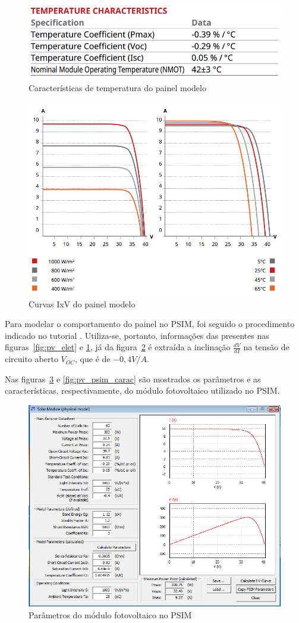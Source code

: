 \documentclass[
	12pt,				%
	openany,
	onseside,
	a4paper,			%
	english,			%
	french,				%
	spanish,			%
	brazil,				%
	]{abntex2}
\begin{document}
\begin{figure}[htbp]%
	\begin{center}%
		\includegraphics[width=0.55 \linewidth]{temp_canad_300}
		\caption{Características de temperatura do painel modelo \cite{Canadian_Datasheet}}
		\label{fig:pv_temp}
	\end{center}
\end{figure}

\begin{figure}[htbp]%
	\begin{center}%
		\includegraphics[width=0.55 \linewidth]{AV_canad_300}
		\caption{Curvas IxV do painel modelo \cite{Canadian_Datasheet}}
		\label{fig:IV_pv_cs}
	\end{center}
\end{figure}

Para modelar o comportamento do painel no PSIM, foi seguido o procedimento indicado no tutorial \cite{PSIM_PV}. Utiliza-se, portanto, informações das presentes nas figuras~\ref{fig:pv_elet} e \ref{fig:pv_temp}, já da figura~\ref{fig:IV_pv_cs} é extraída a inclinação $\frac{dV}{dI}$ na tensão de circuito aberto $V_{OC}$, que é de $-0,4 V/A$.

Nas figuras~\ref{fig:pv_psim_param} e \ref{fig:pv_psim_carac} são mostrados os parâmetros e as características, respectivamente, do módulo fotovoltaico utilizado no PSIM.

\begin{figure}[htbp]%
	\begin{center}%
		\includegraphics[width=0.55 \linewidth]{PV_param}
		\caption{Parâmetros do módulo fotovoltaico no PSIM}
		\label{fig:pv_psim_param}
	\end{center}
\end{figure}
\end{document}

